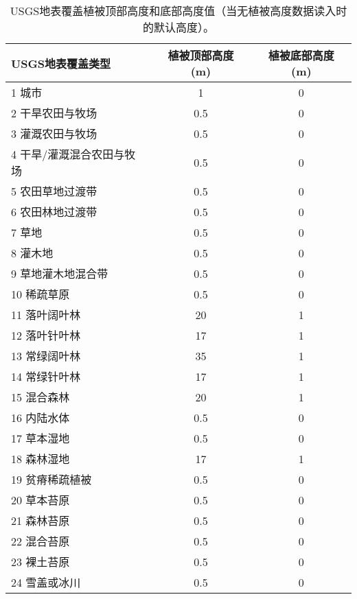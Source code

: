 \begin{table}[]
    \centering
    \caption{USGS地表覆盖植被顶部高度和底部高度值（当无植被高度数据读入时的默认高度）。}
    \label{tab:USGS地表覆盖植被顶部高度和底部高度值}
    \begin{tabular}{@{}lcc@{}}
    \toprule
    USGS地表覆盖类型     & 植被顶部高度 (m) & 植被底部高度 (m) \\ \midrule
    1 城市           & 1          & 0          \\
    2 干旱农田与牧场      & 0.5        & 0          \\
    3 灌溉农田与牧场      & 0.5        & 0          \\
    4 干旱/灌溉混合农田与牧场 & 0.5        & 0          \\
    5 农田草地过渡带      & 0.5        & 0          \\
    6 农田林地过渡带      & 0.5        & 0          \\
    7 草地           & 0.5        & 0          \\
    8 灌木地          & 0.5        & 0          \\
    9 草地灌木地混合带     & 0.5        & 0          \\
    10 稀疏草原        & 0.5        & 0          \\
    11 落叶阔叶林       & 20         & 1          \\
    12 落叶针叶林       & 17         & 1          \\
    13 常绿阔叶林       & 35         & 1          \\
    14 常绿针叶林       & 17         & 1          \\
    15 混合森林        & 20         & 1          \\
    16 内陆水体        & 0.5        & 0          \\
    17 草本湿地        & 0.5        & 0          \\
    18 森林湿地        & 17         & 1          \\
    19 贫瘠稀疏植被      & 0.5        & 0          \\
    20 草本苔原        & 0.5        & 0          \\
    21 森林苔原        & 0.5        & 0          \\
    22 混合苔原        & 0.5        & 0          \\
    23 裸土苔原        & 0.5        & 0          \\
    24 雪盖或冰川       & 0.5        & 0          \\ \bottomrule
    \end{tabular}
\end{table}

